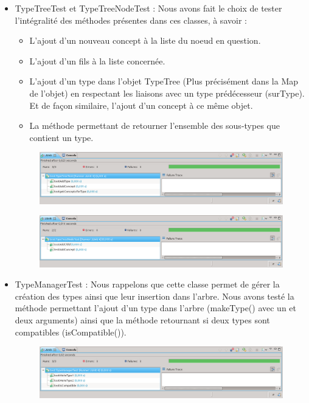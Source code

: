 \documentclass[12pt]{report}
\begin{document}
\begin{itemize}
\item TypeTreeTest et TypeTreeNodeTest : Nous avons fait le choix de tester l'intégralité des méthodes présentes dans ces classes, à savoir :
	\begin{itemize}
	\item L'ajout d'un nouveau concept à la liste du noeud en question. 
	\item L'ajout d'un fils à la liste concernée.
	\item L'ajout d'un type dans l'objet TypeTree (Plus précisément dans la Map de l'objet) en respectant les liaisons avec un type prédécesseur (surType). Et de façon similaire, l'ajout d'un concept à ce même objet.
	\item La méthode permettant de retourner l'ensemble des sous-types que contient un type. 
	\end{itemize}
\begin{figure}[h!]
\begin{center}
	\includegraphics[scale=0.40]{resultatTest8.png}
\end{center}
\end{figure}
\begin{figure}[h!]
\begin{center}
	\includegraphics[scale=0.40]{resultatTest7.png}
\end{center}
\end{figure}
\item TypeManagerTest : Nous rappelons que cette classe permet de gérer la création des types ainsi que leur insertion dans l'arbre. 
Nous avons testé la méthode permettant l'ajout d'un type dans l'arbre (makeType() avec un et deux arguments) ainsi que la méthode retournant si deux types sont compatibles (isCompatible()).
\begin{figure}[h!]
\begin{center}
	\includegraphics[scale=0.40]{resultatTest5.png}

\end{center}
\end{figure}
\end{itemize}
\end{document}
